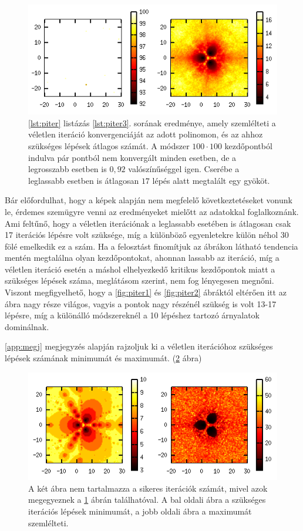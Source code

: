\documentclass[a4paper,12pt]{report}
\begin{document}
				\begin{figure}[ht]
					\centering
					\includegraphics[scale=0.7]{p-iter3.png}
					\caption{\ref{lst:piter} listázás \ref{lst:piter3}. sorának eredménye, amely szemlélteti a véletlen iteráció konvergenciáját az adott polinomon, és az ahhoz szükséges lépések átlagos számát. A módszer $100\cdot 100$ kezdőpontból indulva pár pontból nem konvergált minden esetben, de a legrosszabb esetben is $0,\!92$ valószínűséggel igen. Cserébe a leglassabb esetben is átlagosan $17$ lépés alatt megtalált egy gyököt.} \label{fig:piter3}
				\end{figure}
				
				Bár előfordulhat, hogy a képek alapján nem megfelelő következtetéseket vonunk le, érdemes szemügyre venni az eredményeket mielőtt az adatokkal foglalkoznánk. Ami feltűnő, hogy a véletlen iterációnak a leglassabb esetében is átlagosan csak 17 iterációs lépésre volt szüksége, míg a különböző egyenletekre külön néhol 30 fölé emelkedik ez a szám. Ha a felosztást finomítjuk az ábrákon látható tendencia mentén megtalálna olyan kezdőpontokat, ahonnan lassabb az iteráció, míg a véletlen iteráció esetén a máshol elhelyezkedő kritikus kezdőpontok miatt a szükséges lépések száma, meglátásom szerint, nem fog lényegesen megnőni. Viszont megfigyelhető, hogy a \ref{fig:piter1} és \ref{fig:piter2} ábráktól eltérően itt az ábra nagy része világos, vagyis a pontok nagy részénél szükség is volt 13-17 lépésre, míg a különálló módszereknél a 10 lépéshez tartozó árnyalatok dominálnak.

				\ref{app:megj} megjegyzés alapján rajzoljuk ki a véletlen iterációhoz szükséges lépések számának minimumát és maximumát. (\ref{img:megj} ábra)
				
				\begin{figure}[ht]
					\centering
					\includegraphics[scale=0.7]{p-iter3_2.png}
					\caption{A két ábra nem tartalmazza a sikeres iterációk számát, mivel azok megegyeznek a \ref{fig:piter3} ábrán találhatóval. A bal oldali ábra a szükséges iterációs lépések minimumát, a jobb oldali ábra a maximumát szemlélteti.} \label{img:megj}
				\end{figure}
				
\end{document}

